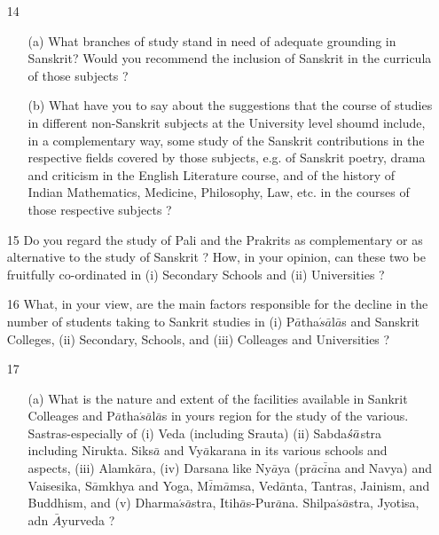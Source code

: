 {\rm 
\begin{itemize}
\item[14] \begin{itemize}
                 \item[(a)] What branches of study stand in need of adequate grounding in Sanskrit? Would you recommend the inclusion of Sanskrit in the curricula of those subjects ?
                 
                 \item[(b)] What have you to say about the suggestions that the course of studies in different non-Sanskrit subjects at the University level shoumd include, in a complementary way, some study of the Sanskrit contributions in the respective fields covered by those subjects, e.g. of Sanskrit poetry, drama and criticism in the English Literature course, and of the history of Indian Mathematics, Medicine, Philosophy, Law, etc. in the courses of those respective subjects ?
              \end{itemize}        
              
    \item[15] Do you regard the study of Pali and the Prakrits as complementary or as alternative to the study of Sanskrit ? How, in your opinion, can these two be fruitfully co-ordinated in (i) Secondary Schools and (ii) Universities ?          
     
     \item[16] What, in your view, are the main factors responsible for the decline in the number of students taking to Sankrit studies in (i) P$\bar{a}$tha$\acute{s}\bar{a}$l$\bar{a}$s and Sanskrit Colleges, (ii) Secondary, Schools, and (iii) Colleages and Universities ?         
      
      \item[17] \begin{itemize}
                 
                 \item[(a)] What is the nature and extent of the facilities available in Sankrit Colleages and P$\bar{a}$tha$\acute{s}\bar{a}$l$\bar{a}$s in yours region for the study of the various. Sastras-especially of (i) Veda (including Srauta) (ii) Sabda$\acute{s}\bar{a}\- $stra including Nirukta. Siks$\bar{a}$ and Vy$\bar{a}$karana in its various schools and aspects, (iii) Alamk$\bar{a}$ra, (iv) Darsana like Ny$\bar{a}$ya (pr$\bar{a}$c$\bar{i}$na and Navya) and Vaisesika, S$\bar{a}$mkhya and Yoga, M$\bar{i}$m$\bar{a}$msa, Ved$\bar{a}$nta, Tantras, Jainism, and Buddhism, and (v) Dharma$\acute{s}\bar{a}$stra, Itih$\bar{a}$s-Pur$\bar{a}$na. Shilpa$\acute{s}\bar{a}$stra, Jyotisa, adn $\bar{A}$yurveda ?
                 

\end{itemize}
\end{itemize}}
